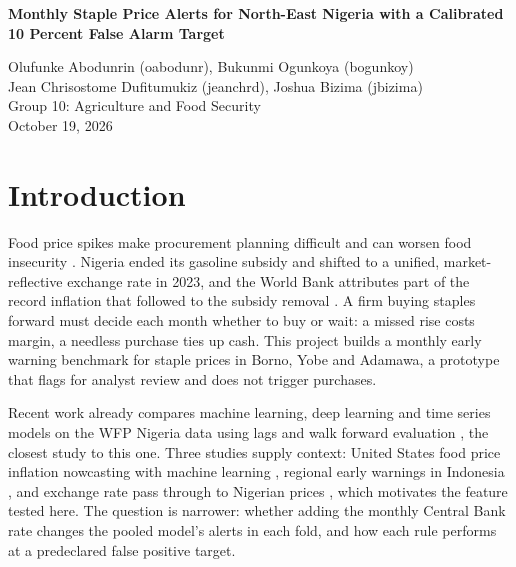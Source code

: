 \documentclass[11pt,a4paper]{article}
\begin{document}
\begin{center}
  {\LARGE\bfseries Monthly Staple Price Alerts for North-East Nigeria with a Calibrated 10 Percent False Alarm Target\par}
  \vspace{4pt}
  {\normalsize
  Olufunke Abodunrin (oabodunr), Bukunmi Ogunkoya (bogunkoy)\\[3pt]
  Jean Chrisostome Dufitumukiz (jeanchrd), Joshua Bizima (jbizima)\\[3pt]
  Group 10: Agriculture and Food Security\\[3pt]
  October 19, 2026\par}
\end{center}

\section{Introduction}\label{sec:intro}

Food price spikes make procurement planning difficult and can worsen food insecurity \cite{amolegbe2021volatility}. Nigeria ended its gasoline subsidy and shifted to a unified, market-reflective exchange rate in 2023, and the World Bank attributes part of the record inflation that followed to the subsidy removal \cite{worldbank2023ndu}. A firm buying staples forward must decide each month whether to buy or wait: a missed rise costs margin, a needless purchase ties up cash. This project builds a monthly early warning benchmark for staple prices in Borno, Yobe and Adamawa, a prototype that flags for analyst review and does not trigger purchases.

Recent work already compares machine learning, deep learning and time series models on the WFP Nigeria data using lags and walk forward evaluation \cite{ogunjobi2026temporal}, the closest study to this one. Three studies supply context: United States food price inflation nowcasting with machine learning \cite{yan2026foodpolicy}, regional early warnings in Indonesia \cite{sumertajaya2024earlywarning}, and exchange rate pass through to Nigerian prices \cite{ugwu2021pass}, which motivates the feature tested here. The question is narrower: whether adding the monthly Central Bank rate changes the pooled model's alerts in each fold, and how each rule performs at a predeclared false positive target.

\end{document}

